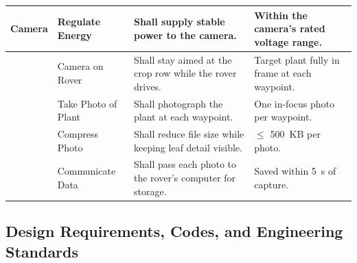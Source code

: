 \documentclass[12pt, letterpaper]{article}
\begin{document}
{\begin{longtable}{@{}>{\raggedright\arraybackslash}p{2.2cm} >{\raggedright\arraybackslash}p{3.0cm} >{\raggedright\arraybackslash}p{5.6cm} >{\raggedright\arraybackslash}p{4.2cm}@{}}
    \textbf{Camera} & Regulate Energy & Shall supply stable power to the camera. & Within the camera's rated voltage range. \\
    \cmidrule[0.2pt](l){2-4}
     & Camera on Rover & Shall stay aimed at the crop row while the rover drives. & Target plant fully in frame at each waypoint. \\
    \cmidrule[0.2pt](l){2-4}
     & Take Photo of Plant & Shall photograph the plant at each waypoint. & One in-focus photo per waypoint. \\
    \cmidrule[0.2pt](l){2-4}
     & Compress Photo & Shall reduce file size while keeping leaf detail visible. & $\leq$ 500~KB per photo. \\
    \cmidrule[0.2pt](l){2-4}
     & Communicate Data & Shall pass each photo to the rover's computer for storage. & Saved within 5~s of capture. \\
\end{longtable}}

\subsection{Design Requirements, Codes, and Engineering Standards}
\end{document}

